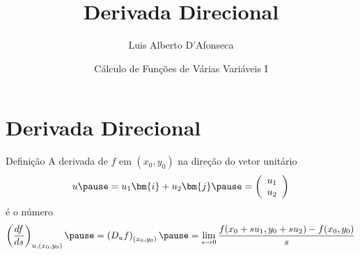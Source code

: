 
\usepackage{apresentacao}
\usepackage{mathconfig}
\usepackage{tabto}


\setcounter{exemplo}{0}

\makeatletter
\graphicspath  {{./figs/}}
\makeatother

\newcommand{\D}[2]{\dfrac{\partial {#1}}{\partial {#2}}}

\newcommand{\vetor}[2]{\left(\begin{array}{c} #1 \\ #2 \end{array}\right)}

\newcommand{\veci}{\bm{i}}
\newcommand{\vecj}{\bm{j}}
\newcommand{\veck}{\bm{k}}

\title {Derivada Direcional}
\author{\large Luis Alberto D'Afonseca}
\date  {Cálculo de Funções de Várias Variáveis I}



\begin{frame}
    \titlepage
\end{frame}

\section{Derivada Direcional}


\begin{frame}{Definição}
  A derivada de $f$ em $(x_0, y_0)$
  \pause
  na direção do vetor unitário
  \[
    u
    \pause
    = u_1 \veci + u_2 \vecj
    \pause
    = \vetor{u_1}{u_2}
  \]
  \pause
  é o número
  \[
    \left(\frac{df}{ds}\right)_{u, (x_0, y_0)}
    \pause
    = \left(D_u f\right)_{(x_0, y_0)}
    \pause
    = \lim_{s\to 0} \frac{f(x_0+su_1, y_0+su_2)-f(x_0, y_0)}{s}
  \]
\end{frame}


